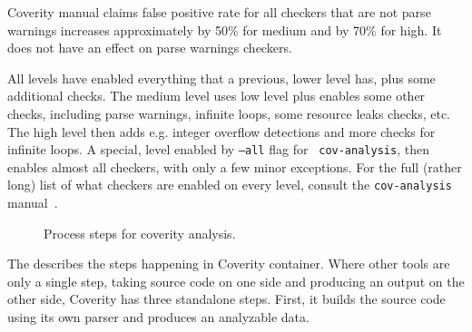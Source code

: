 Coverity manual claims false positive rate for all checkers that are not parse
warnings increases approximately by 50\% for medium and by 70\% for high. It
does not have an effect on parse warnings checkers.

All levels have enabled everything that a previous, lower level has, plus some
additional checks. The medium level uses low level plus enables some other
checks, including parse warnings, infinite loops, some resource leaks checks,
etc. The high level then adds e.g. integer overflow detections and more checks
for infinite loops. A special, level enabled by {\tt --all} flag for {\tt
cov-analysis}, then enables almost all checkers, with only a few minor
exceptions. For the full (rather long) list of what checkers are enabled on every
level, consult the {\tt cov-analysis} manual~\cite{coverityMan}.

\begin{figure}
\caption{Process steps for coverity analysis.}
\label{fig:techniques:coverity:steps}
\end{figure}

The  describes the steps happening in
Coverity container. Where other tools are only a single step, taking source
code on one side and producing an output on the other side, Coverity has three
standalone steps. First, it builds the source code using its own parser and
produces an analyzable data. 

